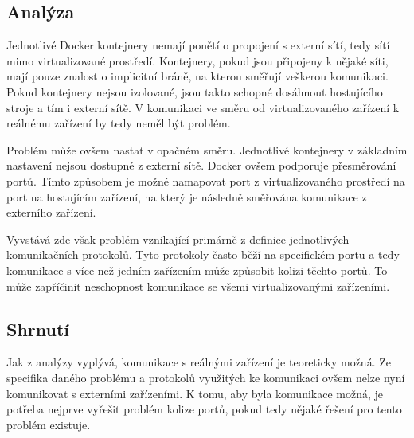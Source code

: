 \subsection{Analýza}

Jednotlivé Docker kontejnery nemají ponětí o propojení s externí sítí, tedy sítí mimo virtualizované prostředí. Kontejnery, pokud jsou připojeny k nějaké síti, mají pouze znalost o implicitní bráně, na kterou směřují veškerou komunikaci. Pokud kontejnery nejsou izolované, jsou takto schopné dosáhnout hostujícího stroje a tím i externí sítě. V komunikaci ve směru od virtualizovaného zařízení k reálnému zařízení by tedy neměl být problém. \cite{docker_brige_overview}

Problém může ovšem nastat v opačném směru. Jednotlivé kontejnery v základním nastavení nejsou dostupné z externí sítě. Docker ovšem podporuje přesměrování portů. Tímto způsobem je možné namapovat port z virtualizovaného prostředí na port na hostujícím zařízení, na který je následně směřována komunikace z externího zařízení. \cite{docker_ports}

Vyvstává zde však problém vznikající primárně z definice jednotlivých komunikačních protokolů. Tyto protokoly často běží na specifickém portu a tedy komunikace s více než jedním zařízením může způsobit kolizi těchto portů. To může zapříčinit neschopnost komunikace se všemi virtualizovanými zařízeními. 

\subsection{Shrnutí}

Jak z analýzy vyplývá, komunikace s reálnými zařízení je teoreticky možná. Ze specifika daného problému a protokolů využitých ke komunikaci ovšem nelze nyní komunikovat s externími zařízeními. K tomu, aby byla komunikace možná, je potřeba nejprve vyřešit problém kolize portů, pokud tedy nějaké řešení pro tento problém existuje. 

